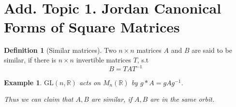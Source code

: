 \documentclass{article}
\theoremstyle{MyNonumberplain}
\theoremstyle{break}
\newcommand{\tmop}{\text}
\theoremstyle{break}
\newtheorem{example}{Example}[section]
\theoremstyle{break}
\theoremstyle{definition}
\theoremstyle{break}
\newtheorem{definition}{Definition}[section]
\begin{document}
\newpage

\section{Add. Topic 1. Jordan Canonical Forms of Square Matrices}
\begin{defbox}
    \begin{definition}[Similar matrices]
        Two $n \times n$ matrices $A$ and $B$ are said to be similar, if there is $n
        \times n$ invertible matrices $T$, s.t
        \[ B = T A T^{- 1} \]
    \end{definition}
\end{defbox}

\begin{expbox}
    \begin{example}
        $\tmop{GL} (n, \mathbb{R})$ acts on $M_n (\mathbb{R})$ by $g \ast A = g A g^{-
        1}$.
        
        Thus we can claim that $A, B$ are similar, if $A, B$ are in the same orbit.
    \end{example}
\end{expbox}
\end{document}
